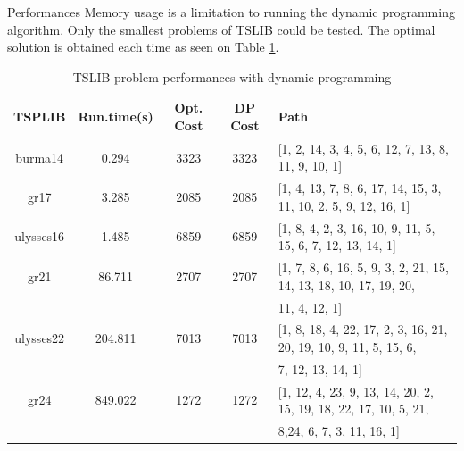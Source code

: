 \documentclass[../report.tex]{subfiles}
\begin{document}
\begin{subsection}{Performances}
Memory usage is a limitation to running the dynamic programming algorithm. Only the smallest problems of TSLIB could be tested. The optimal solution is obtained each time as seen on Table \ref{table:dpt1}.

\begin{table}[H]
\centering
\footnotesize
\begin{tabular}{||c||c|c|c|l||}
\hline
\hline
\bf TSPLIB & \bf Run.time(s) & \bf Opt. Cost & \bf DP Cost & \bf Path \\
\hline
\hline
burma14 & 0.294 & 3323 & 3323 & [1, 2, 14, 3, 4, 5, 6, 12, 7, 13, 8, 11, 9, 10, 1]\\
gr17	& 3.285 & 2085 & 2085 &  [1, 4, 13, 7, 8, 6, 17, 14, 15, 3, 11, 10, 2, 5, 9, 12, 16, 1] \\
ulysses16 & 1.485	 & 6859 & 6859 & [1, 8, 4, 2, 3, 16, 10, 9, 11, 5, 15, 6, 7, 12, 13, 14, 1] \\
gr21& 86.711 & 2707 & 2707 &	[1, 7, 8, 6, 16, 5, 9, 3, 2, 21, 15, 14, 13, 18, 10, 17, 19, 20, \\
 & & & &   11, 4, 12, 1] \\
ulysses22 & 204.811 &	7013 & 7013 & [1, 8, 18, 4, 22, 17, 2, 3, 16, 21, 20, 19, 10, 9, 11, 5, 15, 6,\\
 & & & &    7, 12, 13, 14, 1]\\
gr24	& 849.022 & 1272 & 1272 &	[1, 12, 4, 23, 9, 13, 14, 20, 2, 15, 19, 18, 22, 17, 10, 5, 21, \\
 & & & &  8,24, 6, 7, 3, 11, 16, 1]   \\
\hline
\hline
\end{tabular}
\caption{TSLIB problem performances with dynamic programming}
\label{table:dpt1}
\end{table}

\end{subsection}
\end{document}
